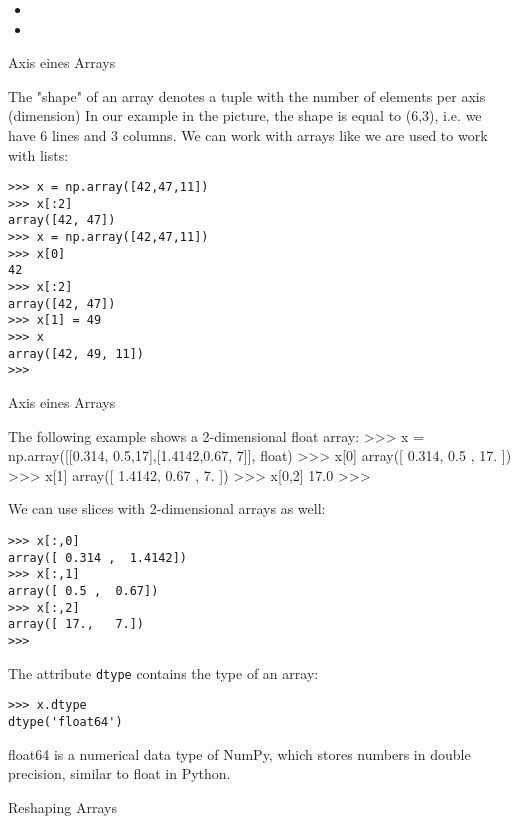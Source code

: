 \begin{itemize}
\item
\item
\end{itemize}

Axis eines Arrays

The "shape" of an array denotes a tuple with the number of elements per axis (dimension) In our example in the picture, the shape is equal to (6,3), i.e. we have 6 lines and 3 columns. 
We can work with arrays like we are used to work with lists: 

\begin{framed}
\begin{verbatim}
>>> x = np.array([42,47,11])
>>> x[:2]
array([42, 47])
>>> x = np.array([42,47,11])
>>> x[0]
42
>>> x[:2]
array([42, 47])
>>> x[1] = 49
>>> x
array([42, 49, 11])
>>>
\end{verbatim}
\end{framed}
Axis eines Arrays

The following example shows a 2-dimensional float array:
>>> x = np.array([[0.314, 0.5,17],[1.4142,0.67, 7]], float)
>>> x[0]
array([  0.314,   0.5  ,  17.   ])
>>> x[1]
array([ 1.4142,  0.67  ,  7.    ])
>>> x[0,2]
17.0
>>>

We can use slices with 2-dimensional arrays as well:
\begin{framed}
\begin{verbatim}
>>> x[:,0]
array([ 0.314 ,  1.4142])
>>> x[:,1]
array([ 0.5 ,  0.67])
>>> x[:,2]
array([ 17.,   7.])
>>> 
\end{verbatim}
\end{framed}

The attribute \texttt{dtype} contains the type of an array:
\begin{framed}
\begin{verbatim}
>>> x.dtype
dtype('float64')
\end{verbatim}
\end{framed}
float64 is a numerical data type of NumPy, which stores numbers in double precision, similar to float in Python.

Reshaping Arrays

